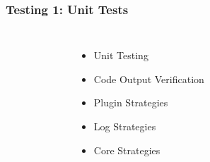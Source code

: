 \begin{frame}[fragile]
\frametitle{Testing 1: Unit Tests}
\begin{columns}
\begin{figure}[b]
{
\scalebox{0.45}{}
}
\end{figure}
\vspace{2em}
\begin{itemize} %
    \item Unit Testing
    \item Code Output Verification
    \item Plugin Strategies
    \item Log Strategies
    \item Core Strategies
\end{itemize}
\end{columns}
\end{frame}


